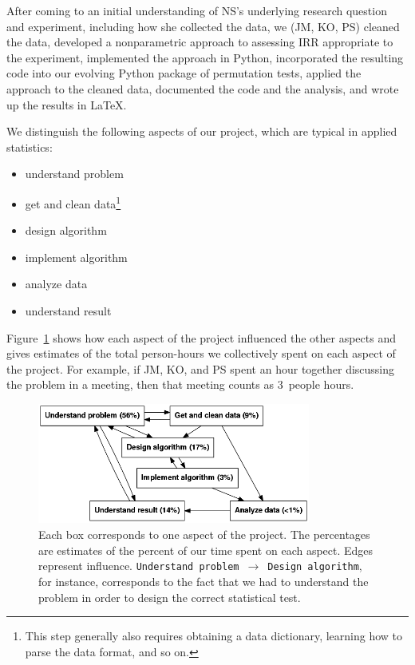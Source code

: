 \documentclass[]{article}
\begin{document}
After coming to an initial understanding of NS's underlying research question
and experiment, including how she collected the data, we (JM, KO, PS) 
cleaned the data, developed a nonparametric approach to assessing IRR
appropriate to the experiment, implemented the approach in Python, incorporated
the resulting code into our evolving Python package of permutation tests,
applied the approach to the cleaned data, documented the code and the analysis,
and wrote up the results in \LaTeX. 

We distinguish the following aspects of our project, which are typical in
applied statistics:
\begin{itemize}
    \item understand problem
    \item get and clean data\footnote{
        This step generally also requires obtaining a data dictionary, learning
        how to parse the data format, and so on.
        }
    \item design algorithm
    \item implement algorithm
    \item analyze data
    \item understand result
\end{itemize}
Figure~\ref{fig:work_process} shows how each aspect of the
project influenced the other aspects and gives estimates of the total person-hours
we collectively spent on each aspect of the project.
For example, if JM, KO, and PS spent an hour together discussing the
problem in a meeting, then that meeting counts as 3~people hours.

\begin{figure}[h]
  \centering
    \includegraphics[width=0.8\textwidth]{_fig/work_process.png}
  \caption{
  \small
    Each box corresponds to one aspect of the project.
    The percentages are estimates of the percent of our time spent on each aspect.
    Edges represent influence.
    \texttt{Understand problem}~$\to$~\texttt{Design algorithm}, for instance,
    corresponds to the fact that we had to understand the problem in order to
    design the correct statistical test.\label{fig:work_process}}
\end{figure}
\end{document}
